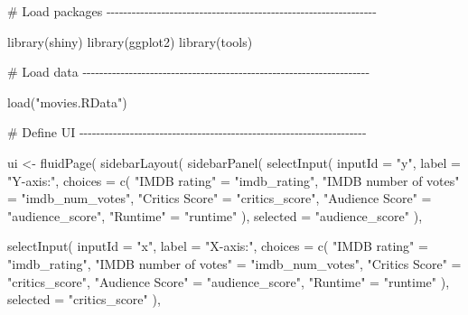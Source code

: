\documentclass[
  letterpaper,
  DIV=11,
  numbers=noendperiod]{scrreprt}
\newenvironment{Shaded}{\begin{snugshade}}{\end{snugshade}}
\newcommand{\AttributeTok}[1]{\textcolor[rgb]{0.40,0.46,0.14}{#1}}
\newcommand{\CommentTok}[1]{\textcolor[rgb]{0.37,0.37,0.37}{#1}}
\newcommand{\FunctionTok}[1]{\textcolor[rgb]{0.28,0.35,0.67}{#1}}
\newcommand{\NormalTok}[1]{\textcolor[rgb]{0.00,0.46,0.62}{#1}}
\newcommand{\OtherTok}[1]{\textcolor[rgb]{0.00,0.46,0.62}{#1}}
\newcommand{\StringTok}[1]{\textcolor[rgb]{0.13,0.47,0.30}{#1}}
\begin{document}
\begin{Shaded}
\begin{Highlighting}[]
\CommentTok{\# Load packages {-}{-}{-}{-}{-}{-}{-}{-}{-}{-}{-}{-}{-}{-}{-}{-}{-}{-}{-}{-}{-}{-}{-}{-}{-}{-}{-}{-}{-}{-}{-}{-}{-}{-}{-}{-}{-}{-}{-}{-}{-}{-}{-}{-}{-}{-}{-}{-}{-}{-}{-}{-}{-}{-}{-}{-}{-}{-}{-}{-}{-}{-}{-}{-}}

\FunctionTok{library}\NormalTok{(shiny)}
\FunctionTok{library}\NormalTok{(ggplot2)}
\FunctionTok{library}\NormalTok{(tools)}

\CommentTok{\# Load data {-}{-}{-}{-}{-}{-}{-}{-}{-}{-}{-}{-}{-}{-}{-}{-}{-}{-}{-}{-}{-}{-}{-}{-}{-}{-}{-}{-}{-}{-}{-}{-}{-}{-}{-}{-}{-}{-}{-}{-}{-}{-}{-}{-}{-}{-}{-}{-}{-}{-}{-}{-}{-}{-}{-}{-}{-}{-}{-}{-}{-}{-}{-}{-}{-}{-}{-}{-}}

\FunctionTok{load}\NormalTok{(}\StringTok{"movies.RData"}\NormalTok{)}

\CommentTok{\# Define UI {-}{-}{-}{-}{-}{-}{-}{-}{-}{-}{-}{-}{-}{-}{-}{-}{-}{-}{-}{-}{-}{-}{-}{-}{-}{-}{-}{-}{-}{-}{-}{-}{-}{-}{-}{-}{-}{-}{-}{-}{-}{-}{-}{-}{-}{-}{-}{-}{-}{-}{-}{-}{-}{-}{-}{-}{-}{-}{-}{-}{-}{-}{-}{-}{-}{-}{-}{-}}

\NormalTok{ui }\OtherTok{\textless{}{-}} \FunctionTok{fluidPage}\NormalTok{(}
  \FunctionTok{sidebarLayout}\NormalTok{(}
    \FunctionTok{sidebarPanel}\NormalTok{(}
      \FunctionTok{selectInput}\NormalTok{(}
        \AttributeTok{inputId =} \StringTok{"y"}\NormalTok{,}
        \AttributeTok{label =} \StringTok{"Y{-}axis:"}\NormalTok{,}
        \AttributeTok{choices =} \FunctionTok{c}\NormalTok{(}
          \StringTok{"IMDB rating"} \OtherTok{=} \StringTok{"imdb\_rating"}\NormalTok{,}
          \StringTok{"IMDB number of votes"} \OtherTok{=} \StringTok{"imdb\_num\_votes"}\NormalTok{,}
          \StringTok{"Critics Score"} \OtherTok{=} \StringTok{"critics\_score"}\NormalTok{,}
          \StringTok{"Audience Score"} \OtherTok{=} \StringTok{"audience\_score"}\NormalTok{,}
          \StringTok{"Runtime"} \OtherTok{=} \StringTok{"runtime"}
\NormalTok{        ),}
        \AttributeTok{selected =} \StringTok{"audience\_score"}
\NormalTok{      ),}

      \FunctionTok{selectInput}\NormalTok{(}
        \AttributeTok{inputId =} \StringTok{"x"}\NormalTok{,}
        \AttributeTok{label =} \StringTok{"X{-}axis:"}\NormalTok{,}
        \AttributeTok{choices =} \FunctionTok{c}\NormalTok{(}
          \StringTok{"IMDB rating"} \OtherTok{=} \StringTok{"imdb\_rating"}\NormalTok{,}
          \StringTok{"IMDB number of votes"} \OtherTok{=} \StringTok{"imdb\_num\_votes"}\NormalTok{,}
          \StringTok{"Critics Score"} \OtherTok{=} \StringTok{"critics\_score"}\NormalTok{,}
          \StringTok{"Audience Score"} \OtherTok{=} \StringTok{"audience\_score"}\NormalTok{,}
          \StringTok{"Runtime"} \OtherTok{=} \StringTok{"runtime"}
\NormalTok{        ),}
        \AttributeTok{selected =} \StringTok{"critics\_score"}
\NormalTok{      ),}


\end{Highlighting}
\end{Shaded}
\end{document}
